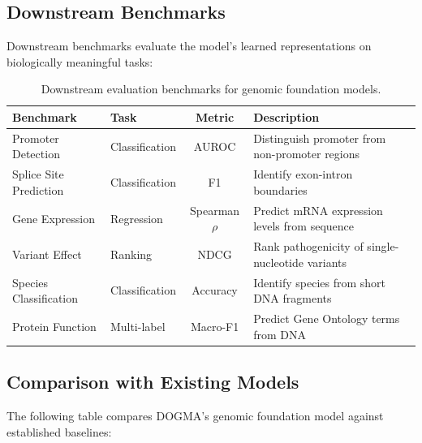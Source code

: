 \subsection{Downstream Benchmarks}

Downstream benchmarks evaluate the model's learned representations on biologically meaningful tasks:

\begin{table}[H]
\centering
\caption{Downstream evaluation benchmarks for genomic foundation models.}
\label{tab:benchmarks}
\begin{tabularx}{\textwidth}{L{3.2cm} L{3cm} c Y}
\toprule
\textbf{Benchmark} & \textbf{Task} & \textbf{Metric} & \textbf{Description} \\
\midrule
Promoter Detection & Classification & AUROC & Distinguish promoter from non-promoter regions \\
Splice Site Prediction & Classification & F1 & Identify exon-intron boundaries \\
Gene Expression & Regression & Spearman $\rho$ & Predict mRNA expression levels from sequence \\
Variant Effect & Ranking & NDCG & Rank pathogenicity of single-nucleotide variants \\
Species Classification & Classification & Accuracy & Identify species from short DNA fragments \\
Protein Function & Multi-label & Macro-F1 & Predict Gene Ontology terms from DNA \\
\bottomrule
\end{tabularx}
\end{table}

\subsection{Comparison with Existing Models}

The following table compares DOGMA's genomic foundation model against established baselines:

